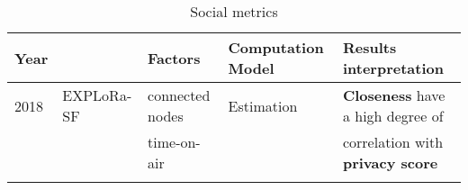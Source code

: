 \onecolumn
\setlength{\hoffset}{-.9in}
\pagestyle{empty}

\begin{longtable}{lllll}
	Year  & \                                              & \textbf{Factors}                 & \textbf{Computation Model}       & \textbf{Results interpretation}                               \\\hline
	2018  & EXPLoRa-SF \cite{cuomo_explora_2017}           & connected nodes            & Estimation                       & \textbf{Closeness} have a high degree of                      \\
	\     &                                                & time-on-air               &                                  & correlation with \textbf{privacy score}                       \\\hline

\caption{Social metrics}
\end{longtable}

\setlength{\hoffset}{-0.5in}
